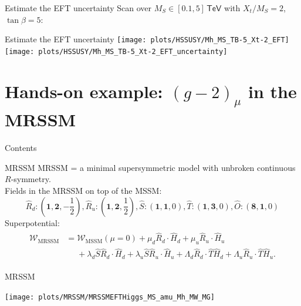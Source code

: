 \documentclass[hyperref={pdfpagelabels=false},ngerman]{beamer}
\newcommand{\eh}[1]{\,\mathsf{#1}}
\newcommand{\MS}{\ensuremath{M_S}}
\begin{document}
\begin{frame}{Estimate the EFT uncertainty}
  Scan over $\MS \in [0.1, 5]\eh{TeV}$ with $X_t/\MS = 2$, $\tan\beta = 5$:\\[2em]
  \usebox{\listbox}
\end{frame}

\begin{frame}{Estimate the EFT uncertainty}
  \texttt{[image: plots/HSSUSY/Mh\_MS\_TB-5\_Xt-2\_EFT]}\hfill
  \texttt{[image: plots/HSSUSY/Mh\_MS\_TB-5\_Xt-2\_EFT\_uncertainty]}
\end{frame}

\section{Hands-on example: $(g-2)_\mu$ in the MRSSM}

\begin{frame}{Contents}
  \tableofcontents[currentsection]  
\end{frame}

\begin{frame}{MRSSM}
  MRSSM = a minimal supersymmetric model with unbroken continuous
  $R$-symmetry.
  \\[1em]
  Fields in the MRSSM on top of the MSSM:
\begin{equation*}
 \hat{R}_d:\textstyle (\mathbf{1} ,\mathbf{2},-\frac{1}{2}) ,
 \hat{R}_u:\textstyle (\mathbf{1} ,\mathbf{2}, \frac{1}{2}) ,
 \hat{S}:\textstyle (\mathbf{1} ,\mathbf{1}, 0) ,
 \hat{T}:\textstyle (\mathbf{1} ,\mathbf{3}, 0) ,
 \hat{O}:\textstyle (\mathbf{8} ,\mathbf{1}, 0)
\end{equation*}
%
Superpotential:
%
\begin{align*}
  \begin{split}
    \mathcal{W}_{\text{MRSSM}} &= \mathcal{W}_{\text{MSSM}}(\mu = 0)
    + \mu_d \hat{R}_d \cdot \hat{H}_d + \mu_u \hat{R}_u\cdot\hat{H}_u \\
    &\phantom{={}}+ \lambda_d \hat{S} \hat{R}_d \cdot \hat{H}_d +
    \lambda_u \hat{S} \hat{R}_u\cdot\hat{H}_u +\Lambda_d
    \hat{R}_d\cdot \hat{T} \hat{H}_d +\Lambda_u \hat{R}_u\cdot\hat{T}
    \hat{H}_u .
  \end{split}
\end{align*}
\end{frame}

\begin{frame}{MRSSM}
  \begin{center}
    \texttt{[image: plots/MRSSM/MRSSMEFTHiggs\_MS\_amu\_Mh\_MW\_MG]}
  \end{center}
\end{frame}
\end{document}
